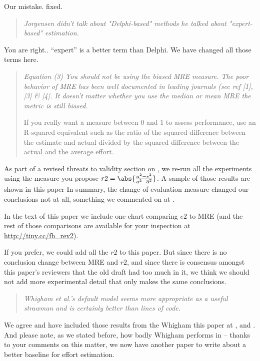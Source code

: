 \noindent Our mistake. fixed.

\begin{quote}{\em Jorgensen didn't talk about "Delphi-based" methods he talked about  "expert-based" estimation.}\end{quote}

\noindent You are right.. ``expert'' is a better term than Delphi. We have changed all those terms here.


\begin{quote}{\em Equation (3) You should not be using the biased
  MRE measure. The poor behavior of MRE has been
  well documented in leading journals (see ref [1],
  [3] \& [4]. It doesn't matter whether you use the
  median or mean MRE the metric is still
  biased.

  If you really want a measure between 0 and 1 to
  assess performance, use an R-squared equivalent
  such as the ratio of the squared difference
  between the estimate and actual divided by the
  squared difference between the actual and the
  average effort.  }\end{quote}

\noindent As part of a revised threats to validity section on , we 
re-run all the experiments using the measure you propose $r2=\abs{\frac{a^2-e^2}{a^2 - \overline{a}^2}}$.
A sample of those results are shown in this paper 
In summary, the change of evaluation measure
changed our conclusions not at all, something we commented on 
at . 

In the text of this paper we   include one chart comparing $e2$ to MRE
(and the rest of those comparisons are available for
your  inspection at \url{http://tiny.cc/fb_rev2}). 


If you prefer,  we could add all the $r2$ to this paper.
But since there is no conclusion change between MRE and $r2$, and since there is consensus amongst this paper's
reviewers that the old draft had too much in it, we think we should not
add  more experimental detail that
only makes the same conclusions.


\begin{quote}{\em Whigham et al.'s default model seems more
  appropriate as a useful strawman and is certainly
  better than lines of code.}\end{quote}

 We agree and 
have included those results from the Whigham this paper at
,  and . And please note, as we stated
before, how badly
Whigham performs in -- thanks to your comments on this matter, we now have
another paper to write about a better baseline for effort estimation.


